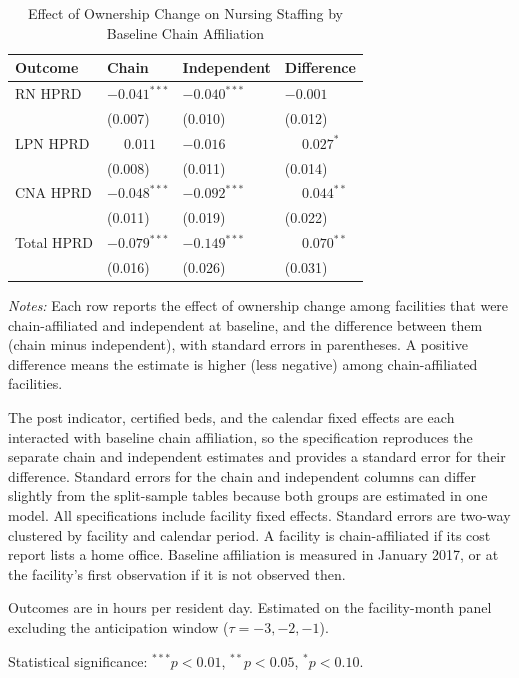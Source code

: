 \begin{table}[!ht]
\centering
\begin{threeparttable}
\caption{Effect of Ownership Change on Nursing Staffing by Baseline Chain Affiliation}
\label{tab:chain-interaction}
\small
\setlength{\tabcolsep}{6pt}

\begin{tabularx}{\textwidth}{@{} l Y Y Y @{}}
\toprule
Outcome & Chain & Independent & Difference \\
\midrule
RN HPRD & $-0.041^{***}$ & $-0.040^{***}$ & $-0.001$ \\
 & (0.007) & (0.010) & (0.012) \\[3pt]
LPN HPRD & $\phantom{-}0.011$ & $-0.016$ & $\phantom{-}0.027^{*}$ \\
 & (0.008) & (0.011) & (0.014) \\[3pt]
CNA HPRD & $-0.048^{***}$ & $-0.092^{***}$ & $\phantom{-}0.044^{**}$ \\
 & (0.011) & (0.019) & (0.022) \\[3pt]
Total HPRD & $-0.079^{***}$ & $-0.149^{***}$ & $\phantom{-}0.070^{**}$ \\
 & (0.016) & (0.026) & (0.031) \\[3pt]
\bottomrule
\end{tabularx}

\begin{tablenotes}[flushleft]
\footnotesize
\item \textit{Notes:} Each row reports the effect of ownership change among facilities that were chain-affiliated and independent at baseline, and the difference between them (chain minus independent), with standard errors in parentheses. A positive difference means the estimate is higher (less negative) among chain-affiliated facilities.
\item The post indicator, certified beds, and the calendar fixed effects are each interacted with baseline chain affiliation, so the specification reproduces the separate chain and independent estimates and provides a standard error for their difference. Standard errors for the chain and independent columns can differ slightly from the split-sample tables because both groups are estimated in one model. All specifications include facility fixed effects. Standard errors are two-way clustered by facility and calendar period. A facility is chain-affiliated if its cost report lists a home office. Baseline affiliation is measured in January 2017, or at the facility's first observation if it is not observed then.
\item Outcomes are in hours per resident day. Estimated on the facility-month panel excluding the anticipation window ($\tau = -3, -2, -1$).
\item Statistical significance: $^{***}p<0.01$, $^{**}p<0.05$, $^{*}p<0.10$.
\end{tablenotes}

\end{threeparttable}
\end{table}
